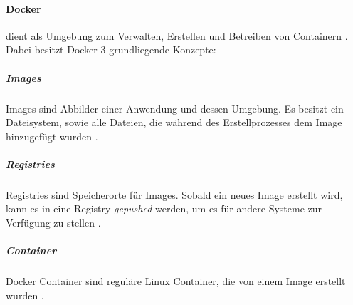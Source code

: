 \paragraph{Docker}
dient als Umgebung zum Verwalten, Erstellen und Betreiben von Containern \cite{Marko2018}.
Dabei besitzt Docker 3 grundliegende Konzepte:

\subparagraph{Images}
Images sind Abbilder einer Anwendung und dessen Umgebung.
Es besitzt ein Dateisystem, sowie alle Dateien, die während des Erstellprozesses dem Image hinzugefügt wurden \cite{Marko2018}.

\subparagraph{Registries}
Registries sind Speicherorte für Images. Sobald ein neues Image erstellt wird, kann es in eine Registry \emph{gepushed} werden,
um es für andere Systeme zur Verfügung zu stellen \cite{Marko2018}.

\subparagraph{Container}
Docker Container sind reguläre Linux Container, die von einem Image erstellt wurden \cite{Marko2018}.